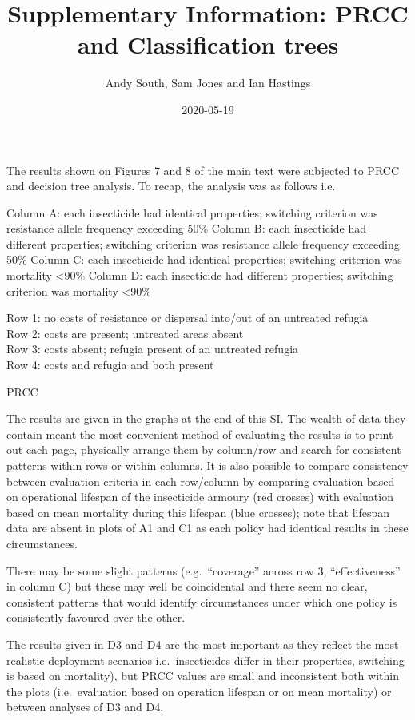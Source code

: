 \documentclass[
]{article}
\title{Supplementary Information: PRCC and Classification trees}
\author{Andy South, Sam Jones and Ian Hastings}
\date{2020-05-19}
\begin{document}
\maketitle

The results shown on Figures 7 and 8 of the main text were subjected to
PRCC and decision tree analysis. To recap, the analysis was as follows
i.e.

Column A: each insecticide had identical properties; switching criterion
was resistance allele frequency exceeding 50\% Column B: each
insecticide had different properties; switching criterion was resistance
allele frequency exceeding 50\% Column C: each insecticide had identical
properties; switching criterion was mortality \textless{}90\% Column D:
each insecticide had different properties; switching criterion was
mortality \textless{}90\%

Row 1: no costs of resistance or dispersal into/out of an untreated
refugia\\
Row 2: costs are present; untreated areas absent\\
Row 3: costs absent; refugia present of an untreated refugia\\
Row 4: costs and refugia and both present\\

\pagebreak

PRCC

The results are given in the graphs at the end of this SI. The wealth of
data they contain meant the most convenient method of evaluating the
results is to print out each page, physically arrange them by column/row
and search for consistent patterns within rows or within columns. It is
also possible to compare consistency between evaluation criteria in each
row/column by comparing evaluation based on operational lifespan of the
insecticide armoury (red crosses) with evaluation based on mean
mortality during this lifespan (blue crosses); note that lifespan data
are absent in plots of A1 and C1 as each policy had identical results in
these circumstances.

There may be some slight patterns (e.g.~``coverage'' across row 3,
``effectiveness'' in column C) but these may well be coincidental and
there seem no clear, consistent patterns that would identify
circumstances under which one policy is consistently favoured over the
other.

The results given in D3 and D4 are the most important as they reflect
the most realistic deployment scenarios i.e.~insecticides differ in
their properties, switching is based on mortality), but PRCC values are
small and inconsistent both within the plots (i.e.~evaluation based on
operation lifespan or on mean mortality) or between analyses of D3 and
D4.
\end{document}
